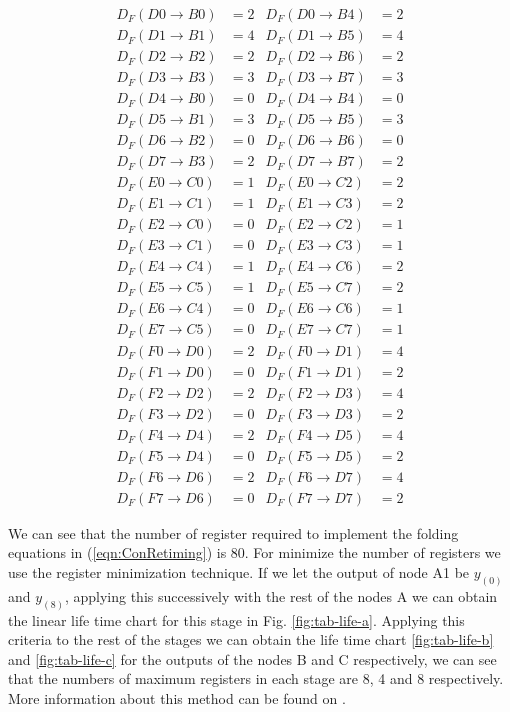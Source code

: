 \documentclass[journal,comsoc]{IEEEtran}
\begin{document}
\begin{small}
\begin{align}\label{eqn:ConRetiming} 
D_F(D0\to B0)&=2 &  D_F(D0\to B4)&=2 		 \\
D_F(D1\to B1)&=4 &  D_F(D1\to B5)&=4\nonumber\\
D_F(D2\to B2)&=2 &  D_F(D2\to B6)&=2\nonumber\\
D_F(D3\to B3)&=3 &  D_F(D3\to B7)&=3\nonumber\\
D_F(D4\to B0)&=0 &  D_F(D4\to B4)&=0\nonumber\\
D_F(D5\to B1)&=3 &  D_F(D5\to B5)&=3\nonumber\\
D_F(D6\to B2)&=0 &  D_F(D6\to B6)&=0\nonumber\\
D_F(D7\to B3)&=2 &  D_F(D7\to B7)&=2\nonumber\\
D_F(E0\to C0)&=1 &  D_F(E0\to C2)&=2\nonumber\\
D_F(E1\to C1)&=1 &  D_F(E1\to C3)&=2\nonumber\\
D_F(E2\to C0)&=0 &  D_F(E2\to C2)&=1\nonumber\\
D_F(E3\to C1)&=0 &  D_F(E3\to C3)&=1\nonumber\\
D_F(E4\to C4)&=1 &  D_F(E4\to C6)&=2\nonumber\\
D_F(E5\to C5)&=1 &  D_F(E5\to C7)&=2\nonumber\\
D_F(E6\to C4)&=0 &  D_F(E6\to C6)&=1\nonumber\\
D_F(E7\to C5)&=0 &  D_F(E7\to C7)&=1\nonumber\\
D_F(F0\to D0)&=2 &  D_F(F0\to D1)&=4\nonumber\\
D_F(F1\to D0)&=0 &  D_F(F1\to D1)&=2\nonumber\\
D_F(F2\to D2)&=2 &  D_F(F2\to D3)&=4\nonumber\\
D_F(F3\to D2)&=0 &  D_F(F3\to D3)&=2\nonumber\\
D_F(F4\to D4)&=2 &  D_F(F4\to D5)&=4\nonumber\\
D_F(F5\to D4)&=0 &  D_F(F5\to D5)&=2\nonumber\\
D_F(F6\to D6)&=2 &  D_F(F6\to D7)&=4\nonumber\\
D_F(F7\to D6)&=0 &  D_F(F7\to D7)&=2\nonumber
\end{align}
\end{small}
We can see that the number of register required to implement the folding equations in (\ref{eqn:ConRetiming}) is 80. For minimize the number of registers we use the register minimization technique. 
If we let the output of node A1 be $y_{(0)}$ and $y_{(8)}$, applying this successively with the rest of the nodes A we can obtain the linear life time chart for this stage in Fig. \ref{fig:tab-life-a}. Applying this criteria to the rest of the stages we can obtain the life time chart \ref{fig:tab-life-b} and \ref{fig:tab-life-c} for the outputs of the nodes B and C respectively, we can see that the numbers of maximum registers in each stage are 8, 4 and 8 respectively. More information about this method can be found on \cite{pipeline_parhi_book}.
\end{document}
